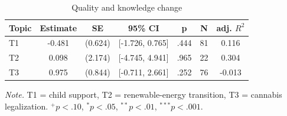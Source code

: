 \begin{table}[htbp]
\centering
\begin{threeparttable}
\caption{Quality and knowledge change}
\label{tab:tab_knowledge_quality}
\begin{tabular}{lcccccc}
\toprule
  Topic & Estimate & SE & 95\% CI & p & N & adj. $R^2$ \\
\midrule
  T1 & -0.481 & (0.624) & [-1.726, 0.765] & .444 & 81 & 0.116 \\
  T2 & 0.098 & (2.174) & [-4.745, 4.941] & .965 & 22 & 0.304 \\
  T3 & 0.975 & (0.844) & [-0.711, 2.661] & .252 & 76 & -0.013 \\
\bottomrule
\end{tabular}
\begin{tablenotes}\footnotesize\item \textit{Note.} T1 = child support, T2 = renewable-energy transition, T3 = cannabis legalization. $^{+}p<.10$, $^{*}p<.05$, $^{**}p<.01$, $^{***}p<.001$.\end{tablenotes}
\end{threeparttable}
\end{table}
